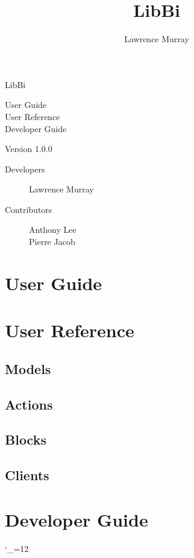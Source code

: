 \documentclass[a4paper,notitlepage]{refrep}
\title{LibBi}
\author{Lawrence Murray}
\date{}
\makeatletter
\newcommand*{\toccontents}{\@starttoc{toc}}
\makeatother
\begin{document}
\pagestyle{empty}

\begin{leftbar}

\vspace{3cm}

\fontsize{72pt}{92pt}\selectfont
LibBi

\vspace{6cm}

\fontsize{24pt}{30pt}\selectfont
User Guide \\
User Reference \\
Developer Guide

\vspace{6cm}

\fontsize{16pt}{24pt}\selectfont
Version 1.0.0

\vspace{1cm}

\end{leftbar}

\newpage
\setcounter{page}{1}
\pagestyle{plain}

\begin{description}
\item[Developers]
Lawrence Murray
\item[Contributors]
Anthony Lee \\
Pierre Jacob
\end{description}

\newpage
\toccontents

\newpage
\setcounter{page}{1}

\chapter{User Guide\label{User_Guide}}



\chapter{User Reference\label{User_Reference}}

\section{Models}


\section{Actions}


\section{Blocks}


\section{Clients}



\chapter{Developer Guide\label{Developer_Guide}}



\begingroup \catcode`_=12 %
\printindex
\endgroup
\end{document}
